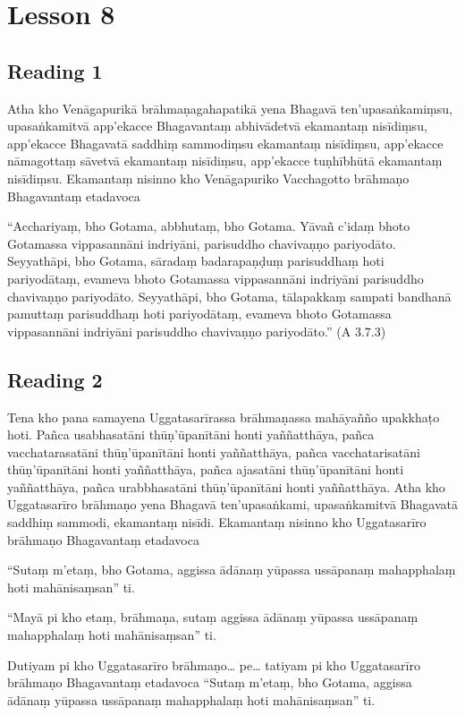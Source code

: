 \chapter{Lesson 8}

\section*{Reading 1}

Atha kho Venāgapurikā brāhmaṇagahapatikā yena Bhagavā ten’upasaṅkamiṃsu, upasaṅkamitvā app’ekacce Bhagavantaṃ abhivādetvā ekamantaṃ nisīdiṃsu, app’ekacce Bhagavatā saddhiṃ sammodiṃsu ekamantaṃ nisīdiṃsu, app’ekacce nāmagottaṃ sāvetvā ekamantaṃ nisīdiṃsu, app’ekacce tuṇhībhūtā ekamantaṃ nisīdiṃsu. Ekamantaṃ nisinno kho Venāgapuriko Vacchagotto brāhmaṇo Bhagavantaṃ etadavoca

“Acchariyaṃ, bho Gotama, abbhutaṃ, bho Gotama. Yāvañ c’idaṃ bhoto Gotamassa vippasannāni indriyāni, parisuddho chavivaṇṇo pariyodāto. Seyyathāpi, bho Gotama, sāradaṃ badarapaṇḍuṃ parisuddhaṃ hoti pariyodātaṃ, evameva bhoto Gotamassa vippasannāni indriyāni parisuddho chavivaṇṇo pariyodāto. Seyyathāpi, bho Gotama, tālapakkaṃ sampati bandhanā pamuttaṃ parisuddhaṃ hoti pariyodātaṃ, evameva bhoto Gotamassa vippasannāni indriyāni parisuddho chavivaṇṇo pariyodāto.” \hfill(A 3.7.3)

\section*{Reading 2}

Tena kho pana samayena Uggatasarīrassa brāhmaṇassa mahāyañño upakkhaṭo hoti. Pañca usabhasatāni thūṇ’ūpanītāni honti yaññatthāya, pañca vacchatarasatāni thūṇ’ūpanītāni honti yaññatthāya, pañca vacchatarisatāni thūṇ’ūpanītāni honti yaññatthāya, pañca ajasatāni thūṇ’ūpanītāni honti yaññatthāya, pañca urabbhasatāni thūṇ’ūpanītāni honti yaññatthāya. Atha kho Uggatasarīro brāhmaṇo yena Bhagavā ten’upasaṅkami, upasaṅkamitvā Bhagavatā saddhiṃ sammodi, ekamantaṃ nisīdi. Ekamantaṃ nisinno kho Uggatasarīro brāhmaṇo Bhagavantaṃ etadavoca

“Sutaṃ m’etaṃ, bho Gotama, aggissa ādānaṃ yūpassa ussāpanaṃ mahapphalaṃ hoti mahānisaṃsan” ti.

“Mayā pi kho etaṃ, brāhmaṇa, sutaṃ aggissa ādānaṃ yūpassa ussāpanaṃ mahapphalaṃ hoti mahānisaṃsan” ti.

Dutiyam pi kho Uggatasarīro brāhmaṇo… pe… tatiyam pi kho Uggatasarīro brāhmaṇo Bhagavantaṃ etadavoca “Sutaṃ m’etaṃ, bho Gotama, aggissa ādānaṃ yūpassa ussāpanaṃ mahapphalaṃ hoti mahānisaṃsan” ti.

